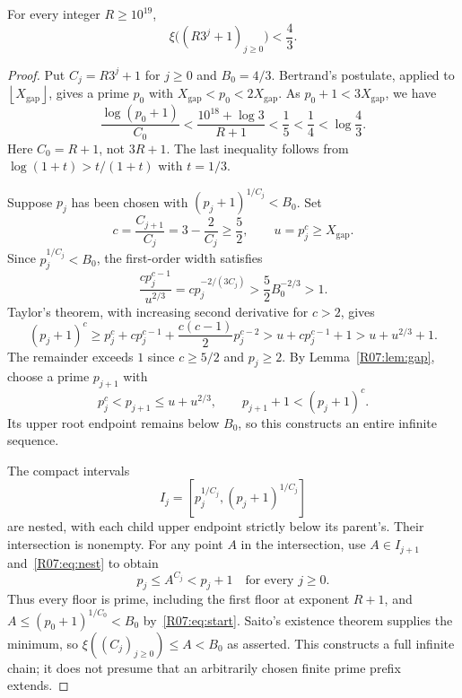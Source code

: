 \documentclass[11pt,a4paper]{article}
\theoremstyle{definition}\newtheorem{definition}[theorem]{Definition}
\theoremstyle{remark}\newtheorem{remark}[theorem]{Remark}
\newcommand{\floor}[1]{\left\lfloor#1\right\rfloor}
\begin{document}
\begin{proposition}\label{R07:prop:upper}
For every integer $R\ge10^{19}$,
\[
                   \xi\bigl((R3^j+1)_{j\ge0}\bigr)<\frac43.
\]
\end{proposition}
\begin{proof}
Put $C_j=R3^j+1$ for $j\ge0$ and $B_0=4/3$.
Bertrand's postulate, applied to $\floor{X_{\mathrm{gap}}}$,
gives a prime $p_0$ with
$X_{\mathrm{gap}}<p_0<2X_{\mathrm{gap}}$.
As $p_0+1<3X_{\mathrm{gap}}$, we have
\begin{equation}\label{R07:eq:start}
 \frac{\log(p_0+1)}{C_0}
 <\frac{10^{18}+\log3}{R+1}
 <\frac15<\frac14<\log\frac43.
\end{equation}
Here $C_0=R+1$, not $3R+1$. The last inequality follows from
$\log(1+t)>t/(1+t)$ with $t=1/3$.

Suppose $p_j$ has been chosen with $(p_j+1)^{1/C_j}<B_0$.
Set
\[
                c=\frac{C_{j+1}}{C_j}=3-\frac2{C_j}\ge\frac52,
                \qquad u=p_j^c\ge X_{\mathrm{gap}}.
\]
Since $p_j^{1/C_j}<B_0$, the first-order width satisfies
\begin{equation}\label{R07:eq:width}
 \frac{cp_j^{c-1}}{u^{2/3}}
       =cp_j^{-2/(3C_j)}
       >\frac52 B_0^{-2/3}>1.
\end{equation}
Taylor's theorem, with increasing second derivative for $c>2$, gives
\[
 (p_j+1)^c\ge p_j^c+cp_j^{c-1}
                   +\frac{c(c-1)}2p_j^{c-2}
             >u+cp_j^{c-1}+1>u+u^{2/3}+1.
\]
The remainder exceeds $1$ since $c\ge5/2$ and $p_j\ge2$.
By Lemma~\ref{R07:lem:gap}, choose a prime $p_{j+1}$ with
\begin{equation}\label{R07:eq:nest}
 p_j^c<p_{j+1}\le u+u^{2/3},\qquad
                        p_{j+1}+1<(p_j+1)^c.
\end{equation}
Its upper root endpoint remains below $B_0$, so this constructs
an entire infinite sequence.

The compact intervals
\[
                  I_j=[p_j^{1/C_j},(p_j+1)^{1/C_j}]
\]
are nested, with each child upper endpoint strictly below its parent's.
Their intersection is nonempty. For any point $A$ in the intersection,
use $A\in I_{j+1}$ and~\eqref{R07:eq:nest} to obtain
\[
                       p_j\le A^{C_j}<p_j+1
                             \quad\text{for every }j\ge0.
\]
Thus every floor is prime, including the first floor at exponent $R+1$,
and $A\le(p_0+1)^{1/C_0}<B_0$ by~\eqref{R07:eq:start}.
Saito's existence theorem supplies the minimum, so
$\xi((C_j)_{j\ge0})\le A<B_0$ as asserted.
This constructs a full infinite chain; it does not presume that an
arbitrarily chosen finite prime prefix extends.
\end{proof}
\end{document}
